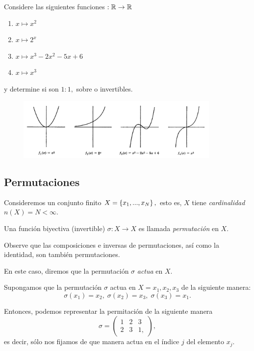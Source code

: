 \begin{exmp}
Considere las siguientes funciones $:\mathbb{R} \to \mathbb{R}$
\begin{enumerate}
\item $x \mapsto x^{2}$
\item $x \mapsto 2^{x}$
\item $x \mapsto x^{3}-2x^{2}-5x+6$
\item $x \mapsto x^{3}$
\end{enumerate}
y determine si son $1:1,$ sobre o invertibles.
\end{exmp}




\begin{figure}[h!]
\centering
\includegraphics[width=10cm]{./md/MD02_IM02.png}
\label{fig:MD0202}
\end{figure}



\subsection{Permutaciones}


Consideremos un conjunto finito $X=\left\{ x_{1},...,x_{N} \right\},$ esto es, $X$ tiene \emph{cardinalidad} $n(X)=N < \infty.$


Una funci\'on biyectiva (invertible) $\sigma:X \to X$ es llamada \emph{permutaci\'on} en $X.$


Observe que las composiciones e inversas de permutaciones, as\'i como la identidad, son tambi\'en permutaciones.


En este caso, diremos que la permutaci\'on $\sigma$ \emph{actua} en $X.$



Supongamos que la permutaci\'on $\sigma$ actua en $X={x_{1},x_{2},x_{3}}$ de la siguiente manera:
$$
\sigma(x_{1})=x_{2}, \; \sigma(x_{2})=x_{3}, \; \sigma(x_{3})=x_{1}.
$$

Entonces, podemos representar la permitaci\'on de la siguiente manera
$$\sigma=
\begin{pmatrix}
1 & 2 & 3 \\
2 & 3 & 1,
\end{pmatrix},
$$  es decir, s\'olo nos fijamos de que manera actua en el \'indice $j$ del elemento $x_{j}.$



